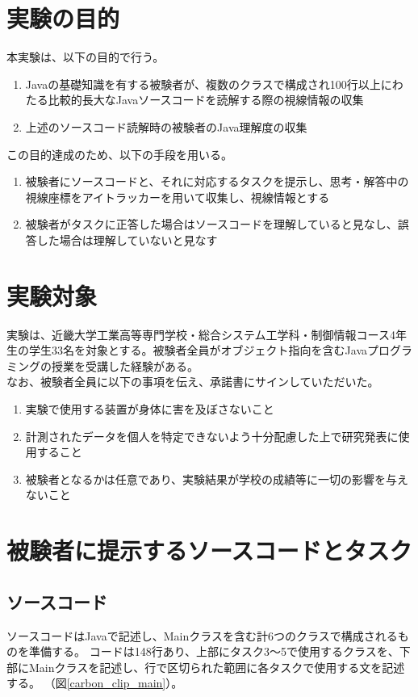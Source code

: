 \documentclass[paper=a4paper,fontsize=11pt]{jlreq}
\begin{document}
  \section{実験の目的}
    本実験は、以下の目的で行う。
    \begin{enumerate}
      \item Javaの基礎知識を有する被験者が、複数のクラスで構成され100行以上にわたる比較的長大なJavaソースコードを読解する際の視線情報の収集
      \item 上述のソースコード読解時の被験者のJava理解度の収集
    \end{enumerate}

    この目的達成のため、以下の手段を用いる。
    \begin{enumerate}
      \item 被験者にソースコードと、それに対応するタスクを提示し、思考・解答中の視線座標をアイトラッカーを用いて収集し、視線情報とする
      \item 被験者がタスクに正答した場合はソースコードを理解していると見なし、誤答した場合は理解していないと見なす
    \end{enumerate}

  \section{実験対象}
    実験は、近畿大学工業高等専門学校・総合システム工学科・制御情報コース4年生の学生33名を対象とする。被験者全員がオブジェクト指向を含むJavaプログラミングの授業を受講した経験がある。\\
    なお、被験者全員に以下の事項を伝え、承諾書にサインしていただいた。
    \begin{enumerate}
      \item 実験で使用する装置が身体に害を及ぼさないこと
      \item 計測されたデータを個人を特定できないよう十分配慮した上で研究発表に使用すること
      \item 被験者となるかは任意であり、実験結果が学校の成績等に一切の影響を与えないこと
    \end{enumerate}

  \section{被験者に提示するソースコードとタスク}
    \subsection{ソースコード}
      ソースコードはJavaで記述し、Mainクラスを含む計6つのクラスで構成されるものを準備する。
      コードは148行あり、上部にタスク3～5で使用するクラスを、下部にMainクラスを記述し、行で区切られた範囲に各タスクで使用する文を記述する。
      （図\ref{carbon_clip_main}）。
\end{document}
